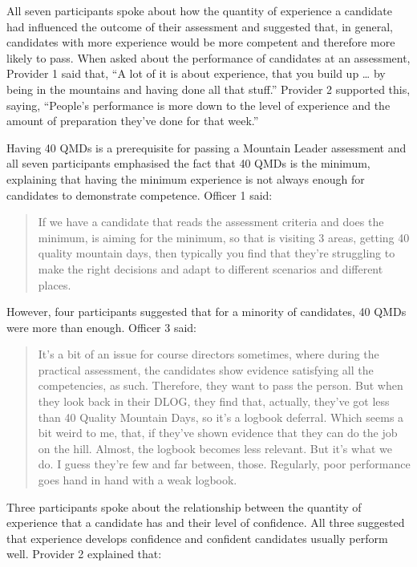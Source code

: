 \documentclass[
  12pt,
  a4paper,
]{book}
\begin{document}
All seven participants spoke about how the quantity of experience a candidate had influenced the outcome of their assessment and suggested that, in general, candidates with more experience would be more competent and therefore more likely to pass. When asked about the performance of candidates at an assessment, Provider 1 said that, ``A lot of it is about experience, that you build up \ldots{} by being in the mountains and having done all that stuff.'' Provider 2 supported this, saying, ``People's performance is more down to the level of experience and the amount of preparation they've done for that week.''

Having 40 QMDs is a prerequisite for passing a Mountain Leader assessment and all seven participants emphasised the fact that 40 QMDs is the minimum, explaining that having the minimum experience is not always enough for candidates to demonstrate competence. Officer 1 said:

\begin{quote}
If we have a candidate that reads the assessment criteria and does the minimum, is aiming for the minimum, so that is visiting 3 areas, getting 40 quality mountain days, then typically you find that they're struggling to make the right decisions and adapt to different scenarios and different places.
\end{quote}

However, four participants suggested that for a minority of candidates, 40 QMDs were more than enough. Officer 3 said:

\begin{quote}
It's a bit of an issue for course directors sometimes, where during the practical assessment, the candidates show evidence satisfying all the competencies, as such. Therefore, they want to pass the person. But when they look back in their DLOG, they find that, actually, they've got less than 40 Quality Mountain Days, so it's a logbook deferral. Which seems a bit weird to me, that, if they've shown evidence that they can do the job on the hill. Almost, the logbook becomes less relevant. But it's what we do. I guess they're few and far between, those. Regularly, poor performance goes hand in hand with a weak logbook.
\end{quote}

Three participants spoke about the relationship between the quantity of experience that a candidate has and their level of confidence. All three suggested that experience develops confidence and confident candidates usually perform well. Provider 2 explained that:
\end{document}
